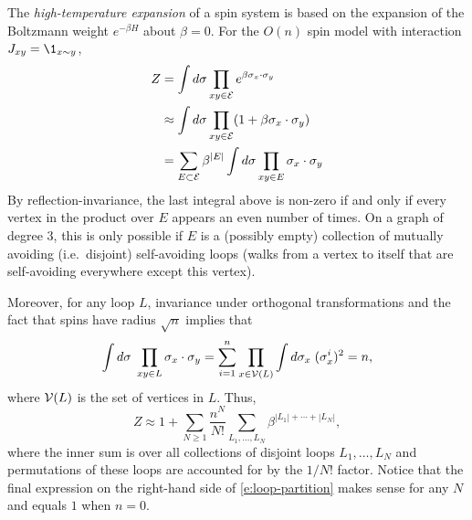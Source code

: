The \emph{high-temperature expansion} of a spin system is based on the expansion of the
Boltzmann weight $e^{-\beta H}$ about $\beta = 0$.
For the $O(n)$ spin model with interaction $J_{xy} = \1_{x\sim y}$,
\begin{align}
Z 
	&=
\int d\sigma \prod_{xy\in\mathcal{E}} e^{\beta \sigma_x \cdot \sigma_y} \nonumber \\
	&\approx
\int d\sigma \prod_{xy\in\mathcal{E}} (1 + \beta \sigma_x \cdot \sigma_y) \nonumber \\
	&=
\sum_{E \subset \mathcal{E}} \beta^{|E|} \int d\sigma \prod_{xy \in E} \sigma_x \cdot \sigma_y
\end{align}
By reflection-invariance, the last integral above is non-zero
if and only if every vertex in the product over $E$ appears an even number of times.
On a graph of degree $3$, this is only possible if $E$ is a (possibly empty) collection
of mutually avoiding (i.e.\ disjoint) self-avoiding loops (walks from a vertex to itself
that are self-avoiding everywhere except this vertex).

Moreover, for any loop $L$, invariance under orthogonal transformations and the fact
that spins have radius $\sqrt n$ implies that
\begin{equation}
\int d\sigma \; \prod_{xy\in L} \sigma_x \cdot \sigma_y
	=
\sum_{i=1}^n \prod_{x\in\mathcal{V}(L)} \int d\sigma_x \; (\sigma^i_x)^2
	=
n,
\end{equation}
where $\mathcal{V}(L)$ is the set of vertices in $L$.
Thus,
\begin{equation}
\label{e:loop-partition}
Z
	\approx
1
	+
\sum_{N \ge 1}
\frac{n^N}{N!}
\sum_{L_1,\ldots,L_N}
\beta^{|L_1|+\cdots+|L_N|},
\end{equation}
where the inner sum is over all collections of disjoint loops $L_1, \ldots, L_N$
and permutations of these loops are accounted for by the $1/N!$ factor.
Notice that the final expression on the right-hand side of \eqref{e:loop-partition}
makes sense for any $N$ and equals $1$ when $n = 0$.

